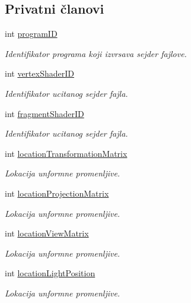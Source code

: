 \subsection*{Privatni članovi}
\begin{DoxyCompactItemize}
\item 
int \hyperlink{classshader_1_1Shader_a11598ec50991c2e59757634e5a38e02d}{program\+ID}
\begin{DoxyCompactList}\small\item\em Identifikator programa koji izvrsava sejder fajlove. \end{DoxyCompactList}\item 
int \hyperlink{classshader_1_1Shader_a6712aab22966fbf9db710aa53945c3c1}{vertex\+Shader\+ID}
\begin{DoxyCompactList}\small\item\em Identifikator ucitanog sejder fajla. \end{DoxyCompactList}\item 
int \hyperlink{classshader_1_1Shader_acbf60b0af53b36fdf5db868591579bf5}{fragment\+Shader\+ID}
\begin{DoxyCompactList}\small\item\em Identifikator ucitanog sejder fajla. \end{DoxyCompactList}\item 
int \hyperlink{classshader_1_1Shader_a7afd377d96d78de28c2acbda73b73e21}{location\+Transformation\+Matrix}
\begin{DoxyCompactList}\small\item\em Lokacija unformne promenljive. \end{DoxyCompactList}\item 
int \hyperlink{classshader_1_1Shader_aaa8ea0af1d2caf3f44ce08cfe26e1558}{location\+Projection\+Matrix}
\begin{DoxyCompactList}\small\item\em Lokacija unformne promenljive. \end{DoxyCompactList}\item 
int \hyperlink{classshader_1_1Shader_a59d584f36e417f8722b500522d9c41f0}{location\+View\+Matrix}
\begin{DoxyCompactList}\small\item\em Lokacija unformne promenljive. \end{DoxyCompactList}\item 
int \hyperlink{classshader_1_1Shader_a3f2c103127077c7a7a92260f6161055c}{location\+Light\+Position}
\begin{DoxyCompactList}\small\item\em Lokacija unformne promenljive. \end{DoxyCompactList}\item 

\end{DoxyCompactItemize}
